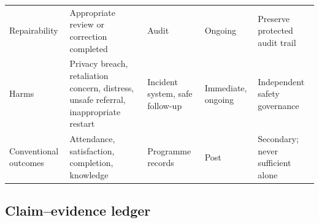 \documentclass[11pt]{article}
\begin{document}
\begin{table}[H]
\begin{tabularx}{\textwidth}{@{}p{3cm}YYp{2.2cm}Y@{}}
Repairability & Appropriate review or correction completed & Audit & Ongoing & Preserve protected audit trail\\
Harms & Privacy breach, retaliation concern, distress, unsafe referral, inappropriate restart & Incident system, safe follow-up & Immediate, ongoing & Independent safety governance\\
Conventional outcomes & Attendance, satisfaction, completion, knowledge & Programme records & Post & Secondary; never sufficient alone\\
\bottomrule
\end{tabularx}
\end{table}

\subsection{Claim--evidence ledger}
\end{document}
